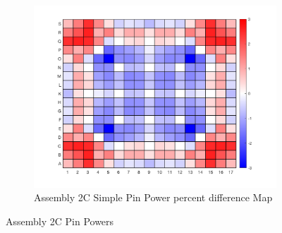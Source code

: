 \documentclass[12pt]{article}
\begin{document}
\begin{figure}[htb!]
        \label{fig:fig}
        \begin{subfigure}{\textwidth}
            \centering
            \includegraphics[scale=0.46]{Figures/2C_simple_pinpowerDiff.png}
            \caption{Assembly 2C Simple Pin Power percent difference Map}
            \label{fig:sub-firstA}
        \end{subfigure}
        \caption{Assembly 2C Pin Powers}
    \end{figure}
    
 
\clearpage
\thispagestyle{empty} 
    
\end{document}
